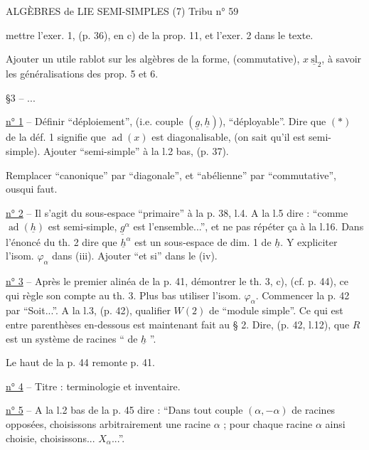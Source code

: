 
ALGÈBRES de LIE SEMI-SIMPLES (7) \hfill Tribu n° 59

mettre l'exer. 1, (p. 36), en c) de la prop. 11, et l'exer. 2 dans le texte.

Ajouter un utile rablot sur les algèbres de la forme, (commutative), $x\ \underline{\mathrm{sl}}_2$, à savoir les généralisations des prop. 5 et 6.

§3 -- ...

\uline{n° 1} -- Définir ``déploiement'', (i.e. couple $(\underline{g},\underline{h})$), ``déployable''. Dire que $(*)$ de la déf. 1 signifie que $\operatorname{ad}(x)$ est diagonalisable, (on sait qu'il est semi-simple). Ajouter ``semi-simple'' à la l.2 bas, (p. 37).

Remplacer ``canonique'' par ``diagonale'', et ``abélienne'' par ``commutative'', ousqui faut.

\uline{n° 2} -- Il s'agit du sous-espace ``primaire'' à la p. 38, l.4. A la l.5 dire : ``comme $\operatorname{ad}(\underline{h})$ est semi-simple, $\underline{g}^{\alpha}$ est l'ensemble...'', et ne pas répéter ça à la l.16. Dans l'énoncé du th. 2 dire que $\underline{h}^{\alpha}$ est un sous-espace de dim. 1 de $\underline{h}$. Y expliciter l'isom. $\varphi_{\alpha}$ dans (iii). Ajouter ``et si'' dans le (iv).

\uline{n° 3} -- Après le premier alinéa de la p. 41, démontrer le th. 3, c), (cf. p. 44), ce qui règle son compte au th. 3. Plus bas utiliser l'isom. $\varphi_{\alpha}$. Commencer la p. 42 par ``Soit...''. A la l.3, (p. 42), qualifier $W(2)$ de ``module simple''. Ce qui est entre parenthèses en-dessous est maintenant fait au § 2. Dire, (p. 42, l.12), que $R$ est un système de racines `` de $\underline{h}$ ''.

Le haut de la p. 44 remonte p. 41.

\uline{n° 4} -- Titre : terminologie et inventaire.

\uline{n° 5} -- A la l.2 bas de la p. 45 dire : ``Dans tout couple $(\alpha,-\alpha)$ de racines opposées, choisissons arbitrairement une racine $\alpha$ ; pour chaque racine $\alpha$ ainsi choisie, choisissons... $X_{\alpha}$...''.
